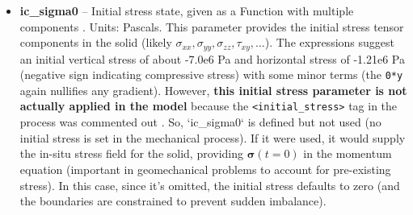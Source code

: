 \documentclass[10pt,a4paper]{article}
\begin{document}
\begin{itemize}
    \item \textbf{ic\_sigma0} -- Initial stress state, given as a Function with multiple components \cite{file:03_parameters_TRM}. Units: Pascals. This parameter provides the initial stress tensor components in the solid (likely $\sigma_{xx}, \sigma_{yy}, \sigma_{zz}, \tau_{xy}, \ldots$). The expressions suggest an initial vertical stress of about -7.0e6 Pa and horizontal stress of -1.21e6 Pa (negative sign indicating compressive stress) with some minor terms (the \texttt{0*y} again nullifies any gradient). However, \textbf{this initial stress parameter is not actually applied in the model} because the \texttt{<initial\_stress>} tag in the process was commented out \cite{file:01_processes_TRM}. So, `ic\_sigma0` is defined but not used (no initial stress is set in the mechanical process). If it were used, it would supply the in-situ stress field for the solid, providing $\boldsymbol{\sigma}(t=0)$ in the momentum equation (important in geomechanical problems to account for pre-existing stress). In this case, since it's omitted, the initial stress defaults to zero (and the boundaries are constrained to prevent sudden imbalance).
\end{itemize}
\end{document}
